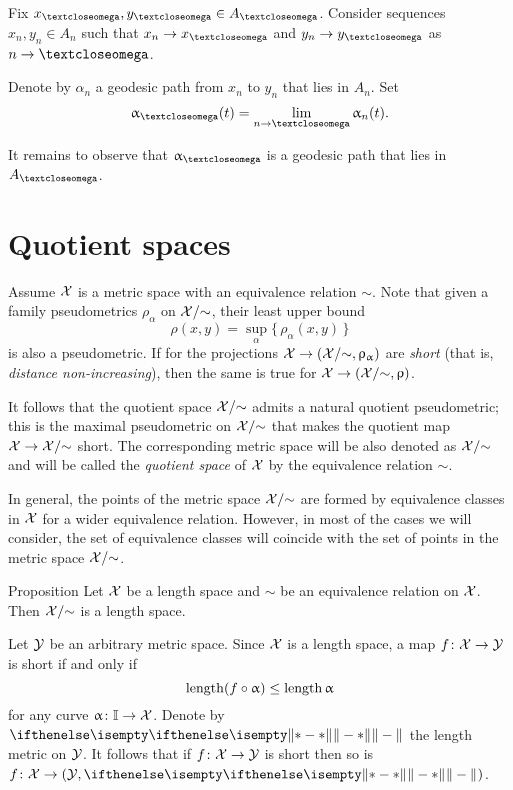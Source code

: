 Fix $x_\o,y_\o\in A_\o$.
Consider sequences $x_n,y_n\in A_n$ such that $x_n\to x_\o$ and $y_n\to y_\o$ as $n\to\o$.

Denote by $\alpha_n$ a geodesic path from $x_n$ to $y_n$ that lies in $A_n$.
Set
\[\alpha_\o(t)=\lim_{n\to \o}\alpha_n(t).\]

It remains to observe that $\alpha_\o$ is a geodesic path that lies in $A_\o$.
\qeds


\section{Quotient spaces}\label{sec:quotient}

 Assume $\mathcal{X}$ is a metric space
with an equivalence relation $\sim$.
Note that given a family pseudometrics $\rho_\alpha$ on $\mathcal{X}/{\sim}$,
their least upper bound
\[\rho(x,y)=\sup_\alpha\{\,\rho_\alpha(x,y)\,\}\]
is also a pseudometric.
If for the projections $\spc{X}\to(\spc{X}/{\sim},\rho_\alpha)$ are \emph{short} (that is, \textit{distance non-increasing}), then the same is true for $\spc{X}\to(\spc{X}/{\sim},\rho)$.

It follows that 
the quotient space $\mathcal{X}/{\sim}$ admits a natural quotient pseudometric;
this is the maximal pseudometric on  $\mathcal{X}/{\sim}$ 
that makes the quotient map 
$\spc{X}\to\spc{X}/{\sim}$ short.
The corresponding metric space will be also denoted as $\mathcal{X}/{\sim}$
and will be called the \emph{quotient space} of $\mathcal{X}$ by the equivalence relation $\sim$.

In general, the points of the metric space $\mathcal{X}/{\sim}$
are formed by equivalence classes in $\mathcal{X}$
for a wider equivalence relation.
However, in most of the cases we will consider, 
the set of equivalence classes will coincide with the set of points in the metric space $\mathcal{X}/{\sim}$.



\begin{thm}{Proposition}\label{prop:length-X}
Let $\mathcal{X}$ be a length space and 
$\sim$ be an equivalence relation on $\mathcal{X}$. Then $\mathcal{X}/{\sim}$
is a length space.
\end{thm}

Let $\mathcal{Y}$ be an arbitrary metric space.
Since $\mathcal{X}$ is a length space,
a map $f\:\spc{X}\to \spc{Y}$ is short if and only if 
\[\length(f\circ\alpha)\le \length\alpha\]
for any curve
$\alpha\:\II\to \spc{X}$.
Denote by $\yetdist{}{}{}$ the length metric on $\mathcal{Y}$.
It follows that if $f\:\spc{X}\to \spc{Y}$ is short
then so is 
$f\:\spc{X}\to (\spc{Y},\yetdist{}{}{})$.

